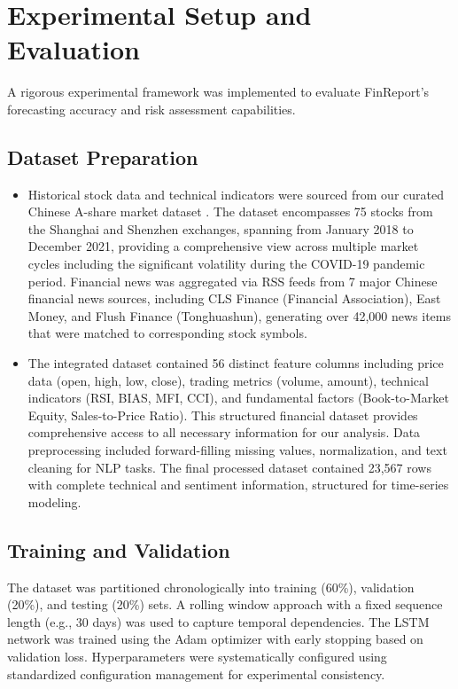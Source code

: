\documentclass[3p,times,procedia]{elsarticle}
\begin{document}
\section{Experimental Setup and Evaluation}
A rigorous experimental framework was implemented to evaluate FinReport's forecasting accuracy and risk assessment capabilities.

\subsection{Dataset Preparation}
\begin{itemize}

\item Historical stock data and technical indicators were sourced from our curated Chinese A-share market dataset \cite{FinReportDataset2025}. The dataset encompasses 75 stocks from the Shanghai and Shenzhen exchanges, spanning from January 2018 to December 2021, providing a comprehensive view across multiple market cycles including the significant volatility during the COVID-19 pandemic period. Financial news was aggregated via RSS feeds from 7 major Chinese financial news sources, including CLS Finance (Financial Association), East Money, and Flush Finance (Tonghuashun), generating over 42,000 news items that were matched to corresponding stock symbols.
\item The integrated dataset \cite{FinReportDataset2025} contained 56 distinct feature columns including price data (open, high, low, close), trading metrics (volume, amount), technical indicators (RSI, BIAS, MFI, CCI), and fundamental factors (Book-to-Market Equity, Sales-to-Price Ratio). This structured financial dataset provides comprehensive access to all necessary information for our analysis. Data preprocessing included forward-filling missing values, normalization, and text cleaning for NLP tasks. The final processed dataset contained 23,567 rows with complete technical and sentiment information, structured for time-series modeling.
\end{itemize}
\subsection{Training and Validation}
The dataset was partitioned chronologically into training (60\%), validation (20\%), and testing (20\%) sets. A rolling window approach with a fixed sequence length (e.g., 30 days) was used to capture temporal dependencies. The LSTM network was trained using the Adam optimizer \cite{Kingma2015} with early stopping based on validation loss. Hyperparameters were systematically configured using standardized configuration management for experimental consistency.
\end{document}
